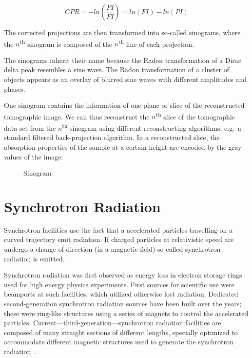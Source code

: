 \begin{equation}
	CPR=-ln\left(\frac{PI}{FI}\right)=ln(FI)-ln(PI)
	\label{eq:cpr}
\end{equation}

The corrected projections are then transformed into so-called sinograms, where the $n$\textsuperscript{th} sinogram is composed of the $n$\textsuperscript{th} line of each projection.

The sinograms inherit their name because the Radon transformation of a Dirac delta peak resembles a sine wave. The Radon transformation of a cluster of objects appears as an overlay of blurred sine waves with different amplitudes and phases.

One sinogram contains the information of one plane or slice of the reconstructed tomographic image. We can thus reconstruct the $n$\textsuperscript{th} slice of the tomographic data-set from the $n$\textsuperscript{th} sinogram using different reconstructing algorithms, e.g.\ a standard filtered back-projection algorithm. In a reconstructed slice, the absorption properties of the sample at a certain height are encoded by the gray values of the image.

\begin{figure}
	\caption{Sinogram}
	\label{fig:sinogram}
\end{figure}

\section{Synchrotron Radiation}
Synchrotron facilities use the fact that a accelerated particles travelling on a curved trajectory emit radiation. If charged particles at relativistic speed are undergo a change of direction (\ie in a magnetic field) so-called synchrotron radiation is emitted. 

Synchrotron radiation was first observed as energy loss in electron storage rings used for high energy physics experiments. First sources for scientific use were beamports at such facilities, which utilized otherwise lost radiation. Dedicated second-generation synchrotron radiation sources have been built over the years; these were ring-like structures using a series of magnets to control the accelerated particles. Current---third-generation---synchrotron radiation facilities are composed of many straight sections of different lengths, specially optimized to accommodate different magnetic structures used to generate the synchrotron radiation~\cite{Stampanoni2002a,Margaritondo2002,wwwsls}. 

